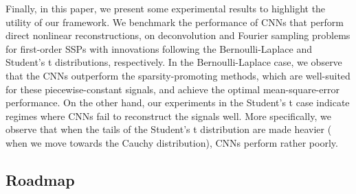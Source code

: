 \documentclass[journal]{IEEEtran}
\begin{document}
Finally, in this paper, we present some experimental results to highlight the utility of our framework. We benchmark the performance of CNNs that perform direct nonlinear reconstructions, on deconvolution and Fourier sampling problems for first-order SSPs with innovations following the Bernoulli-Laplace and Student's t distributions, respectively. In the Bernoulli-Laplace case, we observe that the CNNs outperform the sparsity-promoting methods, which are well-suited for these piecewise-constant signals, and achieve the optimal mean-square-error performance. On the other hand, our experiments in the Student's t case indicate regimes where CNNs fail to reconstruct the signals well. More specifically, we observe that when the tails of the Student's t distribution are made heavier ( when we move towards the Cauchy distribution), CNNs perform rather poorly.




\subsection{Roadmap}


\end{document}
